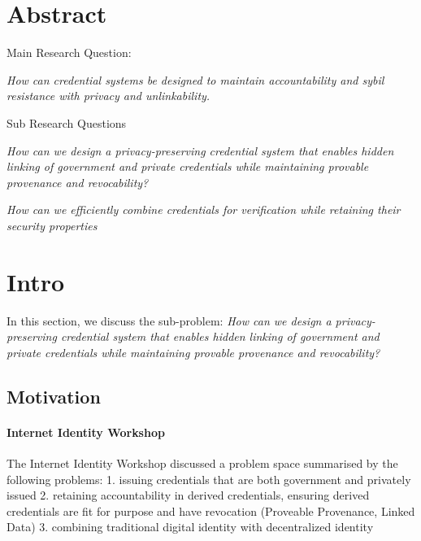 \section{Abstract}
Main Research Question: 

\textit{How can credential systems be designed to maintain accountability and sybil resistance with privacy and unlinkability. }

\noindent Sub Research Questions

\textit{How can we design a privacy-preserving credential system that enables hidden linking of government and private credentials while maintaining provable provenance and revocability?}

\textit{How can we efficiently combine credentials for verification while retaining their security properties}

\newpage
\section{Intro}
In this section, we discuss the sub-problem:
\textit{How can we design a privacy-preserving credential system that enables hidden linking of government and private credentials while maintaining provable provenance and revocability?}





\subsection{Motivation}


\paragraph{Internet Identity Workshop}

The Internet Identity Workshop discussed a problem space summarised by the following problems:
1. issuing credentials that are both government and privately issued
2. retaining accountability in derived credentials, ensuring derived credentials are fit for purpose and have revocation (Proveable Provenance, Linked Data)
3. combining traditional digital identity with decentralized identity

